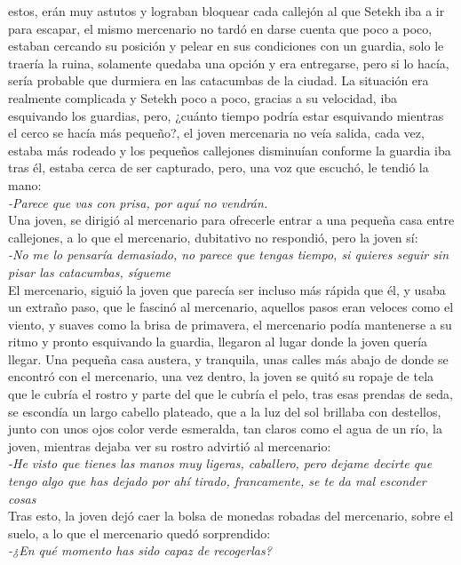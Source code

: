 estos, erán muy astutos y lograban bloquear cada callejón al que Setekh iba a ir para escapar, el mismo mercenario no tardó en darse cuenta que poco a poco, estaban cercando su posición y pelear en sus condiciones con un guardia, solo le traería la ruina, solamente quedaba una opción
y era entregarse, pero si lo hacía, sería probable que durmiera en las catacumbas de la ciudad. La situación era realmente complicada y Setekh poco a poco, gracias a su velocidad, iba esquivando los guardias, pero, ¿cuánto tiempo podría estar esquivando mientras el cerco se hacía más pequeño?,
el joven mercenaria no veía salida, cada vez, estaba más rodeado y los pequeños callejones disminuían conforme la guardia iba tras él, estaba cerca de ser capturado, pero, una voz que escuchó, le tendió la mano:\\
\textit{-Parece que vas con prisa, por aquí no vendrán.} \\
Una joven, se dirigió al mercenario para ofrecerle entrar a una pequeña casa entre callejones, a lo que el mercenario, dubitativo no respondió, pero la joven sí:\\
\textit{-No me lo pensaría demasiado, no parece que tengas tiempo, si quieres seguir sin pisar las catacumbas, sígueme}\\
El mercenario, siguió la joven que parecía ser incluso más rápida que él, y usaba un extraño paso, que le fascinó al mercenario, aquellos pasos eran veloces como el viento, y suaves como la brisa de primavera, el mercenario podía mantenerse a su ritmo y pronto esquivando la guardia, llegaron
al lugar donde la joven quería llegar. Una pequeña casa austera, y tranquila, unas calles más abajo de donde se encontró con el mercenario, una vez dentro, la joven se quitó su ropaje de tela que le cubría el rostro y parte del que le cubría el pelo, tras esas prendas de seda, se escondía un largo cabello plateado,
que a la luz del sol brillaba con destellos, junto con unos ojos color verde esmeralda, tan claros como el agua de un río, la joven, mientras dejaba ver su rostro advirtió al mercenario:\\
\textit{-He visto que tienes las manos muy ligeras, caballero, pero dejame decirte que tengo algo que has dejado por ahí tirado, francamente, se te da mal esconder cosas}\\
Tras esto, la joven dejó caer la bolsa de monedas robadas del mercenario, sobre el suelo, a lo que el mercenario quedó sorprendido:\\
\textit{-¿En qué momento has sido capaz de recogerlas?}\\

